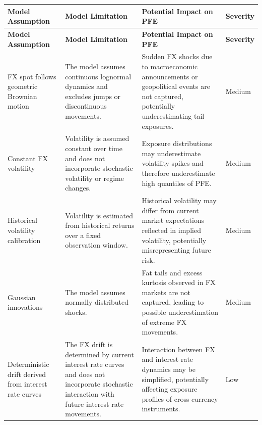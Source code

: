 \begin{landscape}
	
	\renewcommand{\arraystretch}{1.2}
	
	\begin{tabularx}{\linewidth}{>{\RaggedRight\arraybackslash}X
			>{\RaggedRight\arraybackslash}X
			>{\RaggedRight\arraybackslash}X
			>{\centering\arraybackslash}p{2cm}}
		
		\caption{Model Risk Assessment for the FX Simulation Model} \\
		
		\toprule
		\textbf{Model Assumption} &
		\textbf{Model Limitation} &
		\textbf{Potential Impact on PFE} &
		\textbf{Severity} \\
		\midrule
		\endfirsthead
		
		\toprule
		\textbf{Model Assumption} &
		\textbf{Model Limitation} &
		\textbf{Potential Impact on PFE} &
		\textbf{Severity} \\
		\midrule
		\endhead
		
		FX spot follows geometric Brownian motion &
		The model assumes continuous lognormal dynamics and excludes jumps or discontinuous movements. &
		Sudden FX shocks due to macroeconomic announcements or geopolitical events are not captured, potentially underestimating tail exposures. &
		Medium \\
		
		Constant FX volatility &
		Volatility is assumed constant over time and does not incorporate stochastic volatility or regime changes. &
		Exposure distributions may underestimate volatility spikes and therefore underestimate high quantiles of PFE. &
		Medium \\
		
		Historical volatility calibration &
		Volatility is estimated from historical returns over a fixed observation window. &
		Historical volatility may differ from current market expectations reflected in implied volatility, potentially misrepresenting future risk. &
		Medium \\
		
		Gaussian innovations &
		The model assumes normally distributed shocks. &
		Fat tails and excess kurtosis observed in FX markets are not captured, leading to possible underestimation of extreme FX movements. &
		Medium \\
		
		Deterministic drift derived from interest rate curves &
		The FX drift is determined by current interest rate curves and does not incorporate stochastic interaction with future interest rate movements. &
		Interaction between FX and interest rate dynamics may be simplified, potentially affecting exposure profiles of cross-currency instruments. &
		Low \\
		

\end{tabularx}
\end{landscape}
